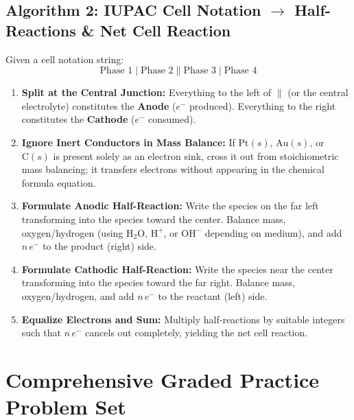 \documentclass[10pt,a4paper]{article}
\begin{document}
\subsection{Algorithm 2: IUPAC Cell Notation $\longrightarrow$ Half-Reactions \& Net Cell Reaction}

Given a cell notation string:
\begin{equation*}
    \text{Phase 1} \mid \text{Phase 2} \parallel \text{Phase 3} \mid \text{Phase 4}
\end{equation*}

\begin{enumerate}[leftmargin=*]
    \item \textbf{Split at the Central Junction:} Everything to the left of $\parallel$ (or the central electrolyte) constitutes the \textbf{Anode} ($e^-$ produced). Everything to the right constitutes the \textbf{Cathode} ($e^-$ consumed).
    
    \item \textbf{Ignore Inert Conductors in Mass Balance:} If $\text{Pt}(s)$, $\text{Au}(s)$, or $\text{C}(s)$ is present solely as an electron sink, cross it out from stoichiometric mass balancing; it transfers electrons without appearing in the chemical formula equation.
    
    \item \textbf{Formulate Anodic Half-Reaction:} Write the species on the far left transforming into the species toward the center. Balance mass, oxygen/hydrogen (using $\text{H}_2\text{O}$, $\text{H}^+$, or $\text{OH}^-$ depending on medium), and add $n\,e^-$ to the product (right) side.
    
    \item \textbf{Formulate Cathodic Half-Reaction:} Write the species near the center transforming into the species toward the far right. Balance mass, oxygen/hydrogen, and add $n\,e^-$ to the reactant (left) side.
    
    \item \textbf{Equalize Electrons and Sum:} Multiply half-reactions by suitable integers such that $n\,e^-$ cancels out completely, yielding the net cell reaction.
\end{enumerate}

\newpage
\section{Comprehensive Graded Practice Problem Set}
\end{document}
